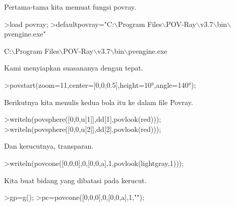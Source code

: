 \documentclass[a4paper,10pt]{article}
\begin{document}
\begin{eulernotebook}
\begin{eulercomment}
\begin{eulercomment}
\begin{eulercomment}
\begin{eulercomment}
\begin{eulercomment}
\begin{eulercomment}
\begin{eulercomment}
\begin{eulercomment}
\begin{eulercomment}
\begin{eulercomment}
\begin{eulercomment}
\begin{eulercomment}
\begin{eulercomment}
\begin{eulercomment}
\begin{eulercomment}
\begin{eulercomment}
\begin{eulercomment}
\begin{eulercomment}
\begin{eulercomment}
\begin{eulercomment}
\begin{eulercomment}
\begin{eulercomment}
\begin{eulercomment}
\begin{eulercomment}
\begin{eulercomment}
\begin{eulercomment}
\begin{eulercomment}
\begin{eulercomment}
\begin{eulercomment}
\begin{eulercomment}
\begin{eulercomment}
\begin{eulercomment}
\begin{eulercomment}
\begin{eulercomment}
\begin{eulercomment}
Pertama-tama kita memuat fungsi povray.
\end{eulercomment}
\begin{eulerprompt}
>load povray;
>defaultpovray="C:\(\backslash\)Program Files\(\backslash\)POV-Ray\(\backslash\)v3.7\(\backslash\)bin\(\backslash\)pvengine.exe"
\end{eulerprompt}
\begin{euleroutput}
  C:\(\backslash\)Program Files\(\backslash\)POV-Ray\(\backslash\)v3.7\(\backslash\)bin\(\backslash\)pvengine.exe
\end{euleroutput}
\begin{eulercomment}
Kami menyiapkan suasananya dengan tepat.
\end{eulercomment}
\begin{eulerprompt}
>povstart(zoom=11,center=[0,0,0.5],height=10°,angle=140°);
\end{eulerprompt}
\begin{eulercomment}
Berikutnya kita menulis kedua bola itu ke dalam file Povray.
\end{eulercomment}
\begin{eulerprompt}
>writeln(povsphere([0,0,u[1]],dd[1],povlook(red)));
>writeln(povsphere([0,0,u[2]],dd[2],povlook(red)));
\end{eulerprompt}
\begin{eulercomment}
Dan kerucutnya, transparan.
\end{eulercomment}
\begin{eulerprompt}
>writeln(povcone([0,0,0],0,[0,0,a],1,povlook(lightgray,1)));
\end{eulerprompt}
\begin{eulercomment}
Kita buat bidang yang dibatasi pada kerucut.
\end{eulercomment}
\begin{eulerprompt}
>gp=g();
>pc=povcone([0,0,0],0,[0,0,a],1,"");

\end{eulerprompt}
\end{eulercomment}
\end{eulercomment}
\end{eulercomment}
\end{eulercomment}
\end{eulercomment}
\end{eulercomment}
\end{eulercomment}
\end{eulercomment}
\end{eulercomment}
\end{eulercomment}
\end{eulercomment}
\end{eulercomment}
\end{eulercomment}
\end{eulercomment}
\end{eulercomment}
\end{eulercomment}
\end{eulercomment}
\end{eulercomment}
\end{eulercomment}
\end{eulercomment}
\end{eulercomment}
\end{eulercomment}
\end{eulercomment}
\end{eulercomment}
\end{eulercomment}
\end{eulercomment}
\end{eulercomment}
\end{eulercomment}
\end{eulercomment}
\end{eulercomment}
\end{eulercomment}
\end{eulercomment}
\end{eulercomment}
\end{eulercomment}
\end{eulernotebook}
\end{document}
